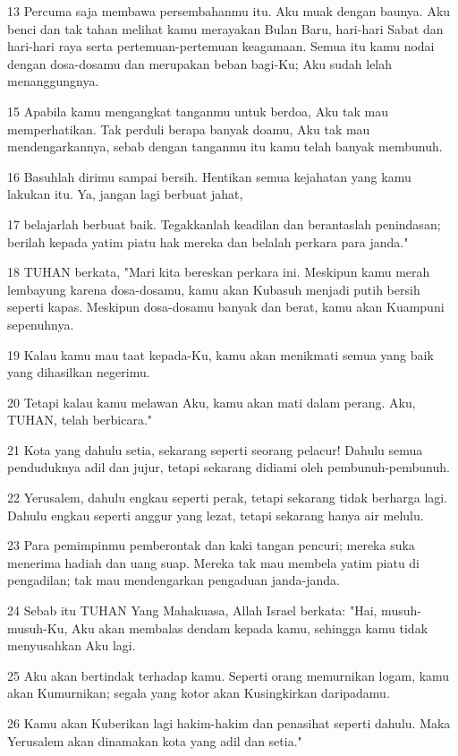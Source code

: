 \par 13 Percuma saja membawa persembahanmu itu. Aku muak dengan baunya. Aku benci dan tak tahan melihat kamu merayakan Bulan Baru, hari-hari Sabat dan hari-hari raya serta pertemuan-pertemuan keagamaan. Semua itu kamu nodai dengan dosa-dosamu dan merupakan beban bagi-Ku; Aku sudah lelah menanggungnya.
\par 15 Apabila kamu mengangkat tanganmu untuk berdoa, Aku tak mau memperhatikan. Tak perduli berapa banyak doamu, Aku tak mau mendengarkannya, sebab dengan tanganmu itu kamu telah banyak membunuh.
\par 16 Basuhlah dirimu sampai bersih. Hentikan semua kejahatan yang kamu lakukan itu. Ya, jangan lagi berbuat jahat,
\par 17 belajarlah berbuat baik. Tegakkanlah keadilan dan berantaslah penindasan; berilah kepada yatim piatu hak mereka dan belalah perkara para janda."
\par 18 TUHAN berkata, "Mari kita bereskan perkara ini. Meskipun kamu merah lembayung karena dosa-dosamu, kamu akan Kubasuh menjadi putih bersih seperti kapas. Meskipun dosa-dosamu banyak dan berat, kamu akan Kuampuni sepenuhnya.
\par 19 Kalau kamu mau taat kepada-Ku, kamu akan menikmati semua yang baik yang dihasilkan negerimu.
\par 20 Tetapi kalau kamu melawan Aku, kamu akan mati dalam perang. Aku, TUHAN, telah berbicara."
\par 21 Kota yang dahulu setia, sekarang seperti seorang pelacur! Dahulu semua penduduknya adil dan jujur, tetapi sekarang didiami oleh pembunuh-pembunuh.
\par 22 Yerusalem, dahulu engkau seperti perak, tetapi sekarang tidak berharga lagi. Dahulu engkau seperti anggur yang lezat, tetapi sekarang hanya air melulu.
\par 23 Para pemimpinmu pemberontak dan kaki tangan pencuri; mereka suka menerima hadiah dan uang suap. Mereka tak mau membela yatim piatu di pengadilan; tak mau mendengarkan pengaduan janda-janda.
\par 24 Sebab itu TUHAN Yang Mahakuasa, Allah Israel berkata: "Hai, musuh-musuh-Ku, Aku akan membalas dendam kepada kamu, sehingga kamu tidak menyusahkan Aku lagi.
\par 25 Aku akan bertindak terhadap kamu. Seperti orang memurnikan logam, kamu akan Kumurnikan; segala yang kotor akan Kusingkirkan daripadamu.
\par 26 Kamu akan Kuberikan lagi hakim-hakim dan penasihat seperti dahulu. Maka Yerusalem akan dinamakan kota yang adil dan setia."
